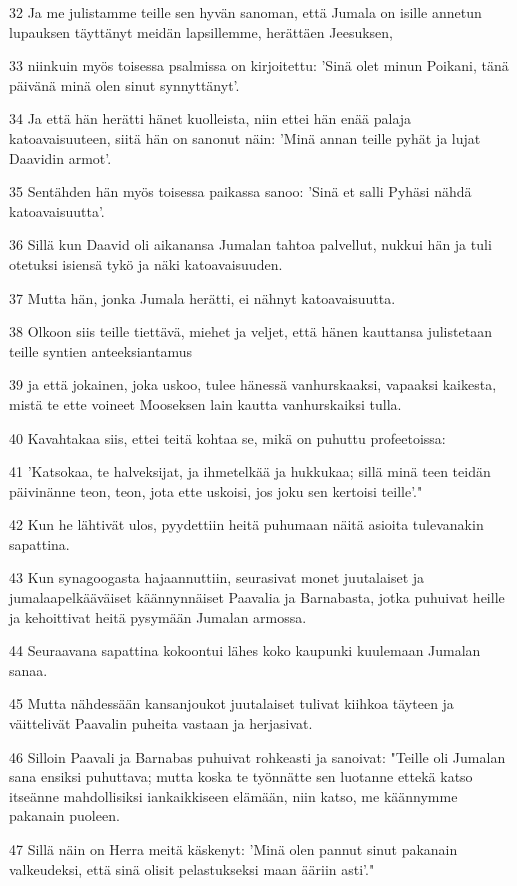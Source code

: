 \par 32 Ja me julistamme teille sen hyvän sanoman, että Jumala on isille annetun lupauksen täyttänyt meidän lapsillemme, herättäen Jeesuksen,
\par 33 niinkuin myös toisessa psalmissa on kirjoitettu: 'Sinä olet minun Poikani, tänä päivänä minä olen sinut synnyttänyt'.
\par 34 Ja että hän herätti hänet kuolleista, niin ettei hän enää palaja katoavaisuuteen, siitä hän on sanonut näin: 'Minä annan teille pyhät ja lujat Daavidin armot'.
\par 35 Sentähden hän myös toisessa paikassa sanoo: 'Sinä et salli Pyhäsi nähdä katoavaisuutta'.
\par 36 Sillä kun Daavid oli aikanansa Jumalan tahtoa palvellut, nukkui hän ja tuli otetuksi isiensä tykö ja näki katoavaisuuden.
\par 37 Mutta hän, jonka Jumala herätti, ei nähnyt katoavaisuutta.
\par 38 Olkoon siis teille tiettävä, miehet ja veljet, että hänen kauttansa julistetaan teille syntien anteeksiantamus
\par 39 ja että jokainen, joka uskoo, tulee hänessä vanhurskaaksi, vapaaksi kaikesta, mistä te ette voineet Mooseksen lain kautta vanhurskaiksi tulla.
\par 40 Kavahtakaa siis, ettei teitä kohtaa se, mikä on puhuttu profeetoissa:
\par 41 'Katsokaa, te halveksijat, ja ihmetelkää ja hukkukaa; sillä minä teen teidän päivinänne teon, teon, jota ette uskoisi, jos joku sen kertoisi teille'."
\par 42 Kun he lähtivät ulos, pyydettiin heitä puhumaan näitä asioita tulevanakin sapattina.
\par 43 Kun synagoogasta hajaannuttiin, seurasivat monet juutalaiset ja jumalaapelkääväiset käännynnäiset Paavalia ja Barnabasta, jotka puhuivat heille ja kehoittivat heitä pysymään Jumalan armossa.
\par 44 Seuraavana sapattina kokoontui lähes koko kaupunki kuulemaan Jumalan sanaa.
\par 45 Mutta nähdessään kansanjoukot juutalaiset tulivat kiihkoa täyteen ja väittelivät Paavalin puheita vastaan ja herjasivat.
\par 46 Silloin Paavali ja Barnabas puhuivat rohkeasti ja sanoivat: "Teille oli Jumalan sana ensiksi puhuttava; mutta koska te työnnätte sen luotanne ettekä katso itseänne mahdollisiksi iankaikkiseen elämään, niin katso, me käännymme pakanain puoleen.
\par 47 Sillä näin on Herra meitä käskenyt: 'Minä olen pannut sinut pakanain valkeudeksi, että sinä olisit pelastukseksi maan ääriin asti'."
